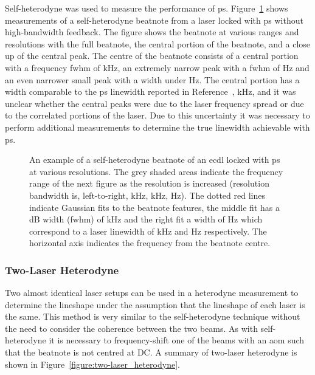 Self-heterodyne was used to measure the performance of \gls{ps}.
Figure~\ref{figure:self-heterodyne_example} shows measurements of a self-heterodyne beatnote from a laser locked with \gls{ps} without high-bandwidth feedback.
The figure shows the beatnote at various ranges and resolutions with the full beatnote, the central portion of the beatnote, and a close up of the central peak.
The centre of the beatnote consists of a central portion with a frequency \gls{fwhm} of \unit[33]{kHz}, an extremely narrow peak with a \gls{fwhm} of \unit[240]{Hz} and an even narrower small peak with a width under \unit[100]{Hz}.
The central portion has a width comparable to the \gls{ps} linewidth reported in Reference~\cite{torii_laser-phase_2012}, \unit[20]{kHz}, and it was unclear whether the central peaks were due to the laser frequency spread or due to the correlated portions of the laser.
Due to this uncertainty it was necessary to perform additional measurements to determine the true linewidth achievable with \gls{ps}.

\begin{figure}
\center

\caption[Example self-heterodyne beatnote.]{An example of a self-heterodyne beatnote of an \gls{ecdl} locked with \gls{ps} at various resolutions.
The grey shaded areas indicate the frequency range of the next figure as the resolution is increased (resolution bandwidth is, left-to-right, \unit[3]{kHz}, \unit[1]{kHz}, \unit[1]{Hz}).
The dotted red lines indicate Gaussian fits to the beatnote features, the middle fit has a \unit[-3]{dB} width (\gls{fwhm}) of \unit[77]{kHz} and the right fit a width of \unit[570]{Hz} which correspond to a laser linewidth of \unit[33]{kHz} and \unit[240]{Hz} respectively.
The horizontal axis indicates the frequency from the beatnote centre.}
\label{figure:self-heterodyne_example}
\end{figure}

\subsubsection{Two-Laser Heterodyne}\label{section:two-laser_heterodyen}

Two almost identical laser setups can be used in a heterodyne measurement to determine the lineshape under the assumption that the lineshape of each laser is the same.
This method is very similar to the self-heterodyne technique without the need to consider the coherence between the two beams.
As with self-heterodyne it is necessary to frequency-shift one of the beams with an \gls{aom} such that the beatnote is not centred at DC.
A summary of two-laser heterodyne is shown in Figure~\ref{figure:two-laser_heterodyne}.

